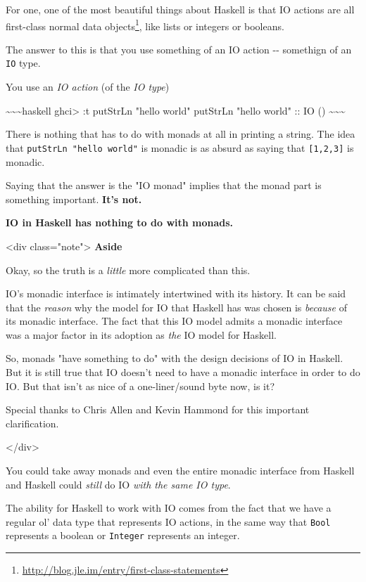 \documentclass[]{article}
\renewcommand{\href}[2]{#2\footnote{\url{#1}}}
\begin{document}
For one, one of the most beautiful things about Haskell is that IO actions are
all \href{http://blog.jle.im/entry/first-class-statements}{first-class normal
data objects}, like lists or integers or booleans.

The answer to this is that you use something of an IO action -\/- somethign of
an \texttt{IO} type.

You use an \emph{IO action} (of the \emph{IO type})

\textasciitilde{}\textasciitilde{}\textasciitilde{}haskell ghci\textgreater{} :t
putStrLn "hello world" putStrLn "hello world" :: IO ()
\textasciitilde{}\textasciitilde{}\textasciitilde{}

There is nothing that has to do with monads at all in printing a string. The
idea that \texttt{putStrLn\ "hello\ world"} is monadic is as absurd as saying
that \texttt{{[}1,2,3{]}} is monadic.

Saying that the answer is the "IO monad" implies that the monad part is
something important. \textbf{It's not.}

\textbf{IO in Haskell has nothing to do with monads.}

\textless{}div class="note"\textgreater{} \textbf{Aside}

Okay, so the truth is a \emph{little} more complicated than this.

IO's monadic interface is intimately intertwined with its history. It can be
said that the \emph{reason} why the model for IO that Haskell has was chosen is
\emph{because} of its monadic interface. The fact that this IO model admits a
monadic interface was a major factor in its adoption as \emph{the} IO model for
Haskell.

So, monads "have something to do" with the design decisions of IO in Haskell.
But it is still true that IO doesn't need to have a monadic interface in order
to do IO. But that isn't as nice of a one-liner/sound byte now, is it?

Special thanks to Chris Allen and Kevin Hammond for this important
clarification.

\textless{}/div\textgreater{}

You could take away monads and even the entire monadic interface from Haskell
and Haskell could \emph{still} do IO \emph{with the same IO type}.

The ability for Haskell to work with IO comes from the fact that we have a
regular ol' data type that represents IO actions, in the same way that
\texttt{Bool} represents a boolean or \texttt{Integer} represents an integer.
\end{document}
